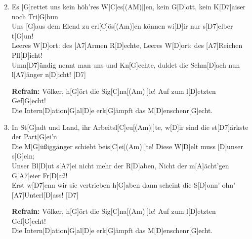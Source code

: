 \begin{guitarMagic}
    \begin{enumerate}
        \setcounter{enumi}{1} %
        \liedweiter

        \item Es [G]rettet uns kein höh’res W[C]es[(AM)|]{en,}
            kein G[D]ott, kein K[D7]aiser noch Tri[G]bun \\
            Uns [G]aus dem Elend zu erl[C]{\"o}s[(Am)]en 
            können wi[D]ir nur s[D7]elber t[G]un! \\
            Leeres W[D]ort: des [A7]Armen R[D]echte, 
            Leeres W[D]ort: des [A7]Reichen Pfl[D]icht! \\
            Unm[D7]{\"u}ndig nennt man uns und Kn[G]echte, 
            duldet die Schm[D]ach nun l[A7]{\"a}nger n[D]icht! [D7]

        \textbf{Refrain:}
            \leftrepeat Völker, h[G]{\"o}rt die Sig[C]na[(Am)|]{le!}
            Auf zum l[D]etzten Gef[G]echt! \\
            Die Intern[D]ation[G]al[D]e
            erk[G]{\"a}mpft das M[D]enschenr[G]echt. \rightrepeat


        \item In St[G]adt und Land, ihr Arbeitsl[C]eu[(Am)|]{te,}
            w[D]ir sind die st[D7]{\"a}rkste der Part[G]ei’n \\
            Die M[G]{\"u}{\ss}iggänger schiebt beis[C]ei[(Am)|]{te!}
            Diese W[D]elt muss [D]unser s[G]ein; \\
            Unser Bl[D]ut s[A7]ei nicht mehr der R[D]aben, 
            Nicht der m[A]{\"a}cht’gen G[A7]eier Fr[D]aß! \\
            Erst w[D7]enn wir sie vertrieben h[G]aben 
            dann scheint die S[D]onn’ ohn’ [A7]Unterl[D]ass! [D7]

        \textbf{Refrain:}
            \leftrepeat Völker, h[G]{\"o}rt die Sig[C]na[(Am)|]{le!}
            Auf zum l[D]etzten Gef[G]echt! \\
            Die Intern[D]ation[G]al[D]e
            erk[G]{\"a}mpft das M[D]enschenr[G]echt. \rightrepeat


    \end{enumerate}
\end{guitarMagic}


